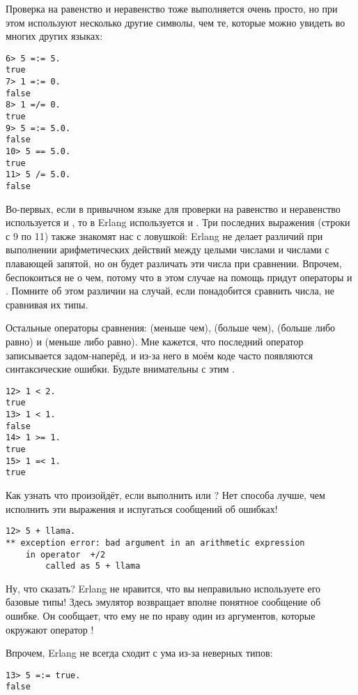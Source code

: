 Проверка на равенство и неравенство тоже выполняется очень просто, но при этом используют несколько другие символы, чем те, которые можно увидеть во многих других языках:
\begin{lstlisting}[style=repl]
6> 5 =:= 5.
true
7> 1 =:= 0.
false
8> 1 =/= 0.
true
9> 5 =:= 5.0.
false
10> 5 == 5.0.
true
11> 5 /= 5.0.
false
\end{lstlisting}

Во\--первых, если в привычном языке для проверки на равенство и неравенство используется \ops{==} и \ops{!=}, то в Erlang используется \ops{=:=} и \ops{=/=}.
Три последних выражения (строки с 9 по 11) также знакомят нас с ловушкой: Erlang не делает различий при выполнении арифметических действий между целыми числами и числами с плавающей запятой, но он будет различать эти числа при сравнении.
Впрочем, беспокоиться не о чем, потому что в этом случае на помощь придут операторы \ops{==} и \ops{/=}.
Помните об этом различии на случай, если понадобится сравнить числа, не сравнивая их типы.

Остальные операторы сравнения: \ops{$<$} (меньше чем), \ops{$>$} (больше чем), \ops{$>=$} (больше либо равно) и \ops{$=<$} (меньше либо равно).
Мне кажется, что последний оператор записывается задом\--наперёд, и из\--за него в моём коде часто появляются синтаксические ошибки.
Будьте внимательны с этим \ops{$=<$}.
\begin{lstlisting}[style=repl]
12> 1 < 2.
true
13> 1 < 1.
false
14> 1 >= 1.
true
15> 1 =< 1.
true
\end{lstlisting}

Как узнать что произойдёт, если выполнить  или ?
Нет способа лучше, чем исполнить эти выражения и испугаться сообщений об ошибках!
\begin{lstlisting}[style=repl]
12> 5 + llama.
** exception error: bad argument in an arithmetic expression
    in operator  +/2
        called as 5 + llama
\end{lstlisting}

Ну, что сказать?
Erlang не нравится, что вы неправильно используете его базовые типы!
Здесь эмулятор возвращает вполне понятное сообщение об ошибке.
Он сообщает, что ему не по нраву один из аргументов, которые окружают оператор \ops{+}!

Впрочем, Erlang не всегда сходит с ума из\--за неверных типов:
\begin{lstlisting}[style=repl]
13> 5 =:= true.
false
\end{lstlisting}

